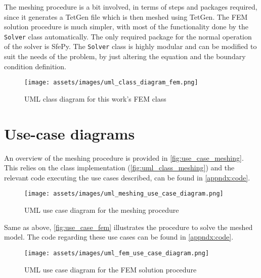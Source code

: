 The meshing procedure is a bit involved, in terms of steps and packages required, since it generates a TetGen file which is then meshed using TetGen. The \gls{FEM} solution procedure is much simpler, with most of the functionality done by the \texttt{Solver} class automatically. The only required package for the normal operation of the solver is SfePy. The \texttt{Solver} class is highly modular and can be modified to suit the needs of the problem, by just altering the equation and the boundary condition definition.

\begin{figure}[H]
    \centering
    \texttt{[image: assets/images/uml\_class\_diagram\_fem.png]}
    \caption{\gls{UML} class diagram for this work's \gls{FEM} class}
    \label{fig:uml_class_fem}
\end{figure}

\section{Use-case diagrams}

An overview of the meshing procedure is provided in \autoref{fig:use_case_meshing}. This relies on the class implementation (\autoref{fig:uml_class_meshing}) and the relevant code executing the use cases described, can be found in \autoref{appndx:code}.

\begin{figure}[H]
    \centering
    \texttt{[image: assets/images/uml\_meshing\_use\_case\_diagram.png]}
    \caption{\gls{UML} use case diagram for the meshing procedure}
    \label{fig:use_case_meshing}
\end{figure}

Same as above, \autoref{fig:use_case_fem} illustrates the procedure to solve the meshed model. The code regarding these use cases can be found in \autoref{appndx:code}.

\begin{figure}[H]
    \centering
    \texttt{[image: assets/images/uml\_fem\_use\_case\_diagram.png]}
    \caption{\gls{UML} use case diagram for the \gls{FEM} solution procedure}
    \label{fig:use_case_fem}
\end{figure}
